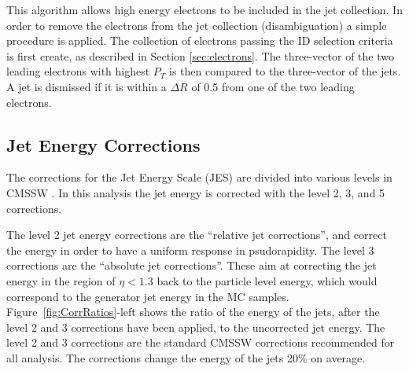 \documentclass[colclass=cmspaper]{combine}
\begin{document}
\begin{linenumbers}
This algorithm allows high energy electrons to be included in the jet collection. 
In order to remove the electrons from the jet collection (disambiguation) a simple procedure is applied.  The collection 
of electrons passing the ID selection criteria is first create, as described in Section \ref{sec:electrons}.  The three-vector of the 
two leading electrons with highest $P_{T}$ is then compared to the three-vector of the jets. 
A jet is dismissed if it is within a $\Delta R$ of 0.5 from one of the two leading electrons. 


\subsection{Jet Energy Corrections}

The corrections for the Jet Energy Scale (JES) are divided into various levels in CMSSW \cite{JES}.  
In this analysis the jet energy is corrected with the level 2, 3, and 5 corrections.  

The level 2 jet energy corrections are the 
``relative jet corrections'', and correct the energy in order to have a uniform response in psudorapidity.  
The level 3 corrections are the ``absolute jet corrections''.  These aim at correcting the jet energy in the 
region of $\eta < 1.3$ back to the particle level energy, which would correspond to the generator jet energy in the MC samples. 
Figure~\ref{fig:CorrRatios}-left shows the ratio of the energy of the jets, after 
the level 2 and 3 corrections have been applied, to the uncorrected jet energy.  
The level 2 and 3 corrections are the standard CMSSW corrections recommended for all analysis. 
The corrections change the energy of the jets 20\% on average.


\end{linenumbers}
\end{document}
